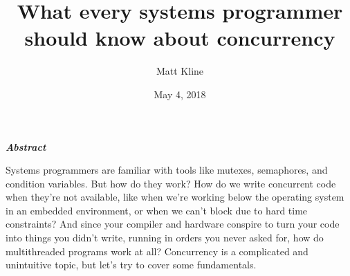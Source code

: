 \documentclass[fontsize=\bodyfontsize, numbers=endperiod]{scrartcl}
\title{What every systems programmer should know about concurrency}
\author{Matt Kline}
\date{May 4, 2018}
\makeatletter
\let\runauthor\@author
\let\rundate\@date
\let\runtitle\@title
\makeatother
\begin{document}
\begin{center}
\Large \textbf{\runtitle}
\bigskip

\large
\runauthor
\smallskip

\normalsize
\rundate
\end{center}
\bigskip

\begin{adjustwidth}{1in}{1in}
\begin{center}
\large \bfseries\itshape Abstract
\end{center}
\smallskip

\noindent
Systems programmers are familiar with tools like mutexes, semaphores,
and condition variables.
But how do they work?
How do we write concurrent code when they're not available,
like when we're working below the operating system in an embedded environment,
or when we can't block due to hard time constraints?
And since your compiler and hardware conspire to turn your code into things
you didn't write, running in orders you never asked for,
how do multithreaded programs work at all?
Concurrency is a complicated and unintuitive topic,
but let's try to cover some fundamentals.
\bigskip

\tableofcontents
\end{adjustwidth}
\medskip
\end{document}
